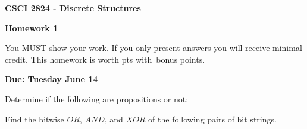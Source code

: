 \documentclass[addpoints]{exam}
\begin{document}
\singlespacing

\begin{center}
  {\large\textbf{CSCI 2824 - Discrete Structures}}

  {\large\textbf{Homework 1}}
\end{center}

You MUST show your work. If you only present answers you will receive minimal
credit. This homework is worth \numpoints pts with \numbonuspoints \,bonus
points.

\textbf{Due: Tuesday June 14}


\begin{questions}
  \question[4] Determine if the following are propositions or not:

  \question[9] Find the bitwise $OR$, $AND$, and $XOR$ of the following pairs
  of bit strings.
 \begin{parts}

\end{parts}
\end{questions}
\end{document}
